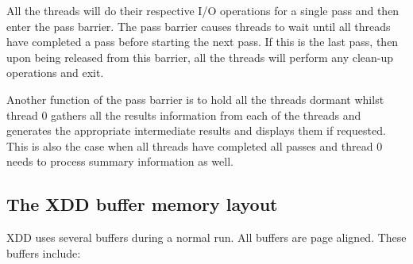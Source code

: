 All the threads will do their respective I/O operations for a single pass and then enter the pass barrier. The pass barrier causes threads to wait until all threads have completed a pass before starting the next pass. If this is the last pass, then upon being released from this barrier, all the threads will perform any clean-up operations and exit.

Another function of the pass barrier is to hold all the threads dormant whilst thread 0 gathers all the results information from each of the threads and generates the appropriate intermediate results and displays them if requested. This is also the case when all threads have completed all passes and thread 0 needs to process summary information as well.

\subsection{The XDD buffer memory layout}\label{the-xdd-buffer-memory-layout}

XDD uses several buffers during a normal run. All buffers are page aligned. These buffers include:

